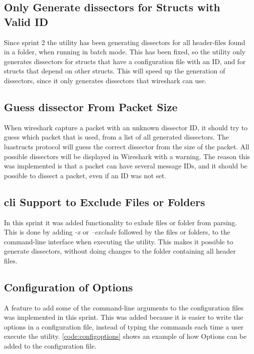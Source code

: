 \subsection{Only Generate \glspl{dissector} for Structs with Valid ID}
Since sprint 2 the \gls{utility} has been generating \glspl{dissector} for all \gls{header}-files 
found in a folder, when running in \gls{batch mode}. This has been fixed, so the \gls{utility} 
only generates \glspl{dissector} for \glspl{struct} that have a configuration file with an 
ID, and for \glspl{struct} that depend on other \glspl{struct}. This will speed up the 
generation of \glspl{dissector}, since it only generates \glspl{dissector} that \Gls{wireshark} 
can use.

\subsection{Guess \gls{dissector} From Packet Size}
When wireshark capture a packet with an unknown dissector ID, it should try to 
guess which packet that is used, from a list of all generated dissectors. The 
luastructs protocol will guess the correct dissector from the size of the 
packet. All possible dissectors will be displayed in Wireshark with a warning. 
The reason this was implemented is that a packet can have several message IDs, 
and it should be possible to dissect a packet, even if an ID was not set.

\subsection{\gls{cli} Support to Exclude Files or Folders}
In this sprint it was added functionality to exlude files or folder from 
parsing. This is done by adding \emph{-x} or \emph{--exclude} followed by the 
files or folders, to the command-line interface when executing the utility. 
This makes it possible to generate dissectors, without doing changes to the 
folder containing all header files.

\subsection{Configuration of Options}
A feature to add some of the command-line arguments to the configuration files 
was implemented in this sprint. This was added because it is easier to write 
the options in a configuration file, instead of typing the commands each time 
a user execute the utility. \autoref{code:configoptions} shows an example of 
how Options can be added to the configuration file.

